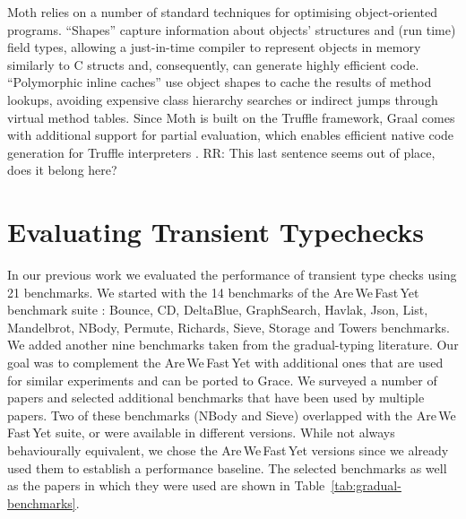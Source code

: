 \documentclass[sigplan,10pt,review,screen]{acmart}\settopmatter{printfolios=true}
\def\AWFY{Are\,We\,Fast\,Yet\xspace}
\newcommand{\RR}[1]{{\color{red}RR: #1}}
\begin{document}
Moth relies on a number of standard techniques for optimising
object-oriented programs.
``Shapes'' \citep{woss2014object} capture information about objects'
structures and (run time) 
field types, allowing a just-in-time compiler to
represent objects in memory similarly to C structs and, consequently,
can generate highly efficient code.
``Polymorphic inline caches''
\citep{Hoelzle:91:PIC} use object shapes to cache the results of
method lookups, avoiding expensive class hierarchy searches or
indirect jumps through virtual method tables. 
Since Moth is built on the Truffle framework,
Graal comes with  additional support for partial evaluation,
which enables efficient native code generation for
Truffle interpreters \citep{Wurthinger:2017:PPE}.
\RR{This last sentence seems out of place, does it belong here?}

\section{Evaluating Transient Typechecks}
\label{s-eval}

In our previous work \cite{roberts-and-co-ecoop-2019} we evaluated the
performance of transient type checks using 21 benchmarks.
We started with the 14 benchmarks of the \AWFY
benchmark suite \cite{Marr2016}: Bounce, CD, DeltaBlue, GraphSearch, Havlak, Json, List, Mandelbrot, NBody, Permute, Richards, Sieve, Storage and Towers benchmarks. We added another nine benchmarks taken from the gradual-typing literature.
Our goal was to complement the \AWFY with additional ones that are used for similar experiments and can be ported to Grace.
We surveyed a number of papers
\citep{Takikawa2016,Vitousek2017,Muehlboeck2017,Bauman2017,Richards2017,Stulova2016,Greenman2018}
and selected additional benchmarks that have been used by multiple papers.
Two of these benchmarks (NBody and Sieve) overlapped with the \AWFY suite,
or were available in different versions.
While not always behaviourally equivalent,
we chose the \AWFY versions since we already used them to
establish a performance baseline.
The selected benchmarks as well as the papers in which they were used are shown in
Table~\ref{tab:gradual-benchmarks}.
\end{document}
